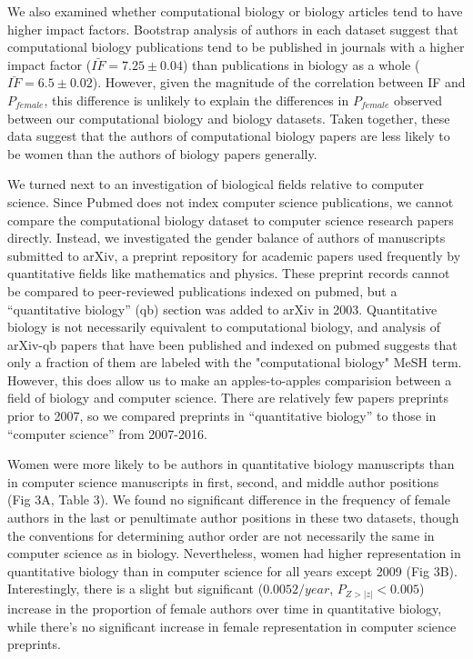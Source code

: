 \documentclass[10pt,letterpaper]{article}
\begin{document}
\begin{flushleft}
We also examined whether computational biology or biology articles tend to have higher impact factors. Bootstrap analysis of authors in each dataset suggest that computational biology publications tend to be published in journals with a higher impact factor ($\bar{IF} = 7.25 \pm 0.04$) than publications in biology as a whole ($\bar{IF} = 6.5 \pm 0.02$). However, given the magnitude of the correlation between IF and $P_{female}$, this difference is unlikely to explain the differences in $P_{female}$ observed between our computational biology and biology datasets. Taken together, these data suggest that the authors of computational biology papers are less likely to be women than the authors of biology papers generally.

We turned next to an investigation of biological fields relative to computer science. Since Pubmed does not index computer science publications, we cannot compare the computational biology dataset to computer science research papers directly. Instead, we investigated the gender balance of authors of manuscripts submitted to arXiv, a preprint repository for academic papers used frequently by quantitative fields like mathematics and physics. These preprint records cannot be compared to peer-reviewed publications indexed on pubmed, but a “quantitative biology” (qb) section was added to arXiv in 2003. Quantitative biology is not necessarily equivalent to computational biology, and analysis of arXiv-qb papers that have been published and indexed on pubmed suggests that only a fraction of them are labeled with the "computational biology" MeSH term. However, this does allow us to make an apples-to-apples comparision between a field of biology and computer science. There are relatively few papers preprints prior to 2007, so we compared preprints in “quantitative biology” to those in “computer science” from 2007-2016.

Women were more likely to be authors in quantitative biology manuscripts than in computer science manuscripts in first, second, and middle author positions (Fig 3A, Table 3). We found no significant difference in the frequency of female authors in the last or penultimate author positions in these two datasets, though the conventions for determining author order are not necessarily the same in computer science as in biology. Nevertheless, women had higher representation in quantitative biology than in computer science for all years except 2009 (Fig 3B). Interestingly, there is a slight but significant ($0.0052 / year$, $P_{Z > |z|} < 0.005$) increase in the proportion of female authors over time in quantitative biology, while there’s no significant increase in female representation in computer science preprints.


\end{flushleft}
\end{document}

